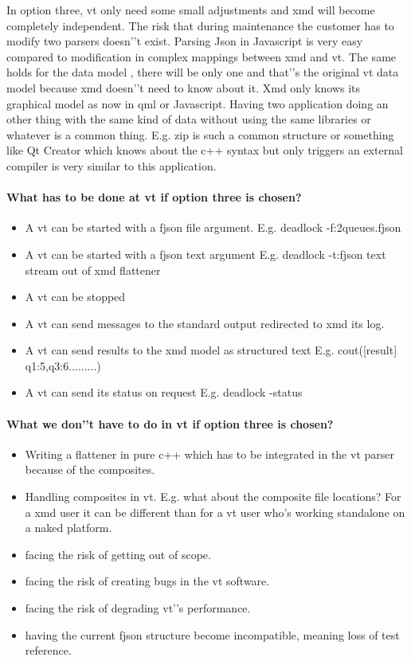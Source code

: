 \documentclass[a4paper,11pt,final]{article}
\begin{document}
In option three, vt only need some small adjustments and xmd will become
completely independent.
The risk that during maintenance the customer has to modify two
parsers doesn'’t exist. Parsing Json in Javascript is very easy compared
to modification in complex mappings between xmd and vt.
The same holds for the data model , there will be only one and that'’s the
original vt data model because xmd doesn'’t need to know about it.
Xmd only knows its graphical model as now in qml or Javascript.
Having two application doing an other thing with the same kind of data
without using the same libraries or whatever is a common thing.
E.g. zip is such a common structure or something like Qt Creator
which knows about the c++ syntax but only triggers an external
compiler is very similar to this application.

\paragraph{What has to be done at vt if option three is chosen?}
\begin{itemize}
\item A vt can be started with a fjson file argument.
		E.g. deadlock -f:2queues.fjson
\item A vt can be started with a fjson text argument
		E.g. deadlock -t:{fjson text stream out of xmd flattener}
\item A vt can be stopped
\item A vt can send messages to the standard output redirected to xmd its log.
\item A vt can send results to the xmd model as structured text
		E.g. cout([result] q1:5,q3:6.........)
\item A vt can send its status on request E.g. deadlock -status
\end{itemize}

\paragraph{What we don'’t have to do in vt if option three is chosen?}
\begin{itemize}
\item Writing a flattener in pure c++ which has to be integrated
	in the vt parser because of the composites.
\item Handling composites in vt. E.g. what about the composite 
	file locations? For a xmd user it can be different than for
	a vt user who's working standalone on a naked platform.
\item facing the risk of getting out of scope.
\item facing the risk of creating bugs in the vt software.
\item facing the risk of degrading vt'’s performance.
\item having the current fjson structure become incompatible,
	meaning loss of test reference.
\end{itemize}
\end{document}

